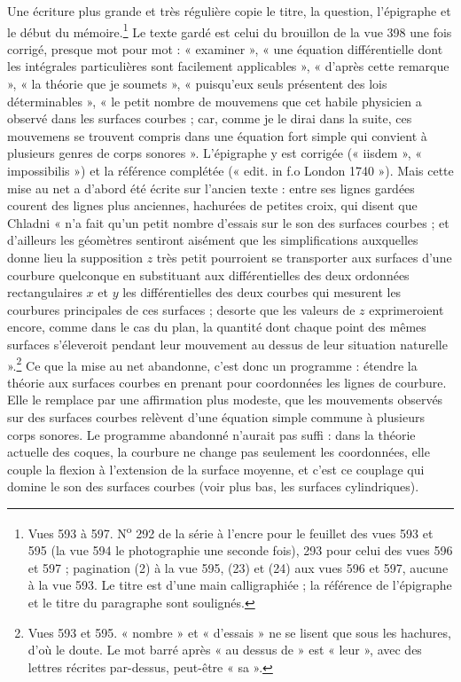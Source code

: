 \documentclass[11pt,a4paper]{article}
\begin{document}
Une écriture plus grande et très régulière copie le titre, la question, l'épigraphe
et le début du mémoire.\footnote{Vues 593 à 597. N\textsuperscript{o} 292 de la série
à l'encre pour le feuillet des vues 593 et 595 (la vue 594 le photographie une seconde
fois), 293 pour celui des vues 596 et 597 ; pagination (2) à la vue 595, (23) et (24)
aux vues 596 et 597, aucune à la vue 593. Le titre est d'une main calligraphiée ; la
référence de l'épigraphe et le titre du paragraphe sont soulignés.} Le texte gardé est
celui du brouillon de la vue 398 une fois corrigé, presque mot pour mot : « examiner »,
« une équation différentielle dont les intégrales particulières sont facilement
applicables », « d'après cette remarque », « la théorie que je soumets », « puisqu'eux
seuls présentent des lois déterminables », « le petit nombre de mouvemens que cet
habile physicien a observé dans les surfaces courbes ; car, comme je le dirai dans la
suite, ces mouvemens se trouvent compris dans une équation fort simple qui convient à
plusieurs genres de corps sonores ». L'épigraphe y est corrigée (« iisdem »,
« impossibilis ») et la référence complétée (« edit. in f.o London 1740 »). Mais cette
mise au net a d'abord été écrite sur l'ancien texte : entre ses lignes gardées courent
des lignes plus anciennes, hachurées de petites croix, qui disent que Chladni « n'a
fait qu'un petit nombre d'essais sur le son des surfaces courbes ; et d'ailleurs les
géomètres sentiront aisément que les simplifications auxquelles donne lieu la
supposition $z$ très petit pourroient se transporter aux surfaces d'une courbure
quelconque en substituant aux différentielles des deux ordonnées rectangulaires $x$ et
$y$ les différentielles des deux courbes qui mesurent les courbures principales de ces
surfaces ; desorte que les valeurs de $z$ exprimeroient encore, comme dans le cas du
plan, la quantité dont chaque point des mêmes surfaces s'éleveroit pendant leur
mouvement au dessus de leur situation naturelle ».\footnote{Vues 593 et 595. « nombre »
et « d'essais » ne se lisent que sous les hachures, d'où le doute. Le mot barré après
« au dessus de » est « leur », avec des lettres récrites par-dessus, peut-être
« sa ».} Ce que la mise au net abandonne, c'est donc un programme : étendre la théorie
aux surfaces courbes en prenant pour coordonnées les lignes de courbure. Elle le
remplace par une affirmation plus modeste, que les mouvements observés sur des surfaces
courbes relèvent d'une équation simple commune à plusieurs corps sonores. Le programme
abandonné n'aurait pas suffi : dans la théorie actuelle des coques, la courbure ne
change pas seulement les coordonnées, elle couple la flexion à l'extension de la
surface moyenne, et c'est ce couplage qui domine le son des surfaces courbes (voir plus
bas, les surfaces cylindriques).
\end{document}
